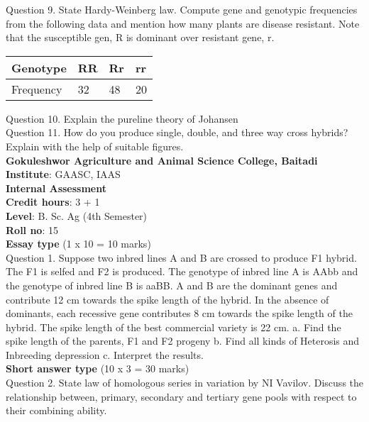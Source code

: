 \documentclass[12pt]{article}\usepackage[]{graphicx}\usepackage[]{color}
\begin{document}
Question 9. State Hardy-Weinberg law. Compute gene and genotypic frequencies from the following data and mention how many plants are disease resistant. Note that the susceptible gen, R is dominant over resistant gene, r.\\ 
\begin{table}[H]
\centering\begingroup\fontsize{8}{10}\selectfont

\begin{tabular}[t]{llll}
\toprule
Genotype & RR & Rr & rr\\
\midrule
Frequency & 32 & 48 & 20\\
\bottomrule
\end{tabular}
\endgroup{}
\end{table}
Question 10. Explain the pureline theory of Johansen\\
Question 11. How do you produce single, double, and three way cross hybrids? Explain with the help of suitable figures.\\
\clearpage 
{\centering \Large{\textbf{Gokuleshwor Agriculture and Animal Science College, Baitadi}} \\[0.25cm]
            \textbf{Institute}: GAASC, IAAS \\[0.2cm]
            \textbf{Internal Assessment} \\[0.2cm]} 
\textbf{Credit hours}: 3 + 1 \\ 
\textbf{Level}: B. Sc. Ag (4th Semester) \\
\textbf{Roll no}: 15 \\[0.5cm] 
\textbf{Essay type} (1 x 10 = 10 marks) \\
Question 1. Suppose two inbred lines A and B are crossed to produce F1 hybrid. The F1 is selfed and F2 is produced. The genotype of inbred line A is AAbb and the genotype of inbred line B is aaBB. A and B are the dominant genes and contribute 12 cm towards the spike length of the hybrid. In the absence of dominants, each recessive gene contributes 8 cm towards the spike length of the hybrid. The spike length of the best commercial variety is 22 cm. a. Find the spike length of the parents, F1 and F2 progeny b. Find all kinds of Heterosis and Inbreeding depression c. Interpret the results.\\
\textbf{Short answer type} (10 x 3 = 30 marks) \\
Question 2. State law of homologous series in variation by NI Vavilov. Discuss the relationship between, primary, secondary and tertiary gene pools with respect to their combining ability.\\
\end{document}
